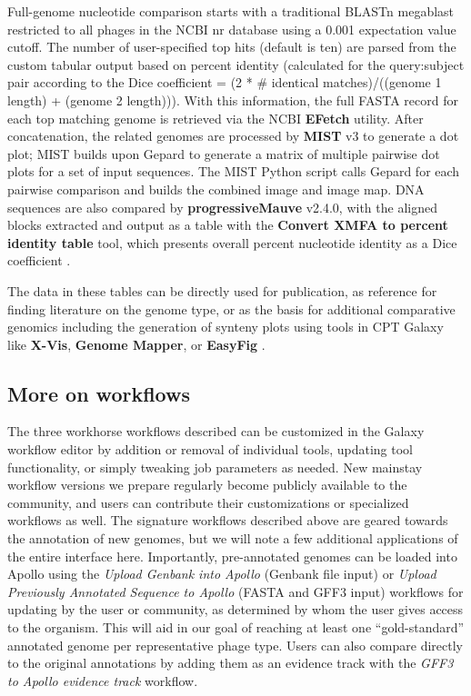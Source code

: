 Full-genome nucleotide comparison starts with a traditional BLASTn
megablast restricted to all phages in the NCBI nr database using a 0.001
expectation value cutoff. The number of user-specified top hits (default
is ten) are parsed from the custom tabular output based on percent
identity (calculated for the query:subject pair according to the Dice
coefficient = (2 * \# identical matches)/((genome 1 length) + (genome 2
length))). With this information, the full FASTA record for each top
matching genome is retrieved via the NCBI \textbf{EFetch} utility. After
concatenation, the related genomes are processed by \textbf{MIST} v3 to
generate a dot plot; MIST builds upon Gepard \cite{Krumsiek_2007} to generate a
matrix of multiple pairwise dot plots for a set of input sequences. The
MIST Python script calls Gepard for each pairwise comparison and builds
the combined image and image map. DNA sequences are also compared by
\textbf{progressiveMauve} v2.4.0, with the aligned blocks extracted and
output as a table with the \textbf{Convert XMFA to percent identity
table} tool, which presents overall percent nucleotide identity as a
Dice coefficient \cite{Krumsiek_2007,Darling_2010}.

The data in these tables can be directly used for publication, as
reference for finding literature on the genome type, or as the basis for
additional comparative genomics including the generation of synteny
plots using tools in CPT Galaxy like \textbf{X-Vis}, \textbf{Genome
Mapper}, or \textbf{EasyFig} \cite{Sullivan_2011}.

\subsection*{More on workflows}

The three workhorse workflows described can be customized in the Galaxy
workflow editor by addition or removal of individual tools, updating
tool functionality, or simply tweaking job parameters as needed. New
mainstay workflow versions we prepare regularly become publicly
available to the community, and users can contribute their
customizations or specialized workflows as well. The signature workflows
described above are geared towards the annotation of new genomes, but we
will note a few additional applications of the entire interface here.
Importantly, pre-annotated genomes can be loaded into Apollo using the
\emph{Upload Genbank into Apollo} (Genbank file input) or \emph{Upload
Previously Annotated Sequence to Apollo} (FASTA and GFF3 input)
workflows for updating by the user or community, as determined by whom
the user gives access to the organism. This will aid in our goal of
reaching at least one ``gold-standard'' annotated genome per
representative phage type. Users can also compare directly to the
original annotations by adding them as an evidence track with the
\emph{GFF3 to Apollo evidence track} workflow.

